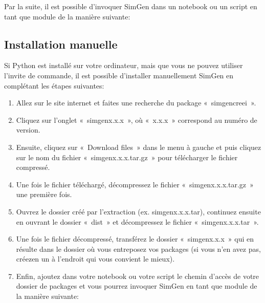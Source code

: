 \documentclass[letterpaper,10pt,french]{sphinxmanual}
\begin{document}
Par la suite, il est possible d’invoquer SimGen dans un notebook ou un script en tant que module de la manière suivante:

\begin{sphinxVerbatim}[commandchars=\\\{\}]
 
\end{sphinxVerbatim}


\subsection{Installation manuelle}
\label{\detokenize{installation:installation-manuelle}}
Si Python est installé sur votre ordinateur, mais que vous ne pouvez utiliser l’invite de commande,
il est possible d’installer manuellement SimGen en complétant les étapes suivantes:
\begin{enumerate}
%
\item {} 
Allez sur le site internet  et faites une recherche du package « simgen\sphinxhyphen{}creei ».

\item {} 
Cliquez sur l’onglet « simgen\sphinxhyphen{}x.x.x », où « x.x.x » correspond au numéro de version.

\item {} 
Ensuite, cliquez sur « Download files » dans le menu à gauche et puis cliquez sur le nom du fichier « simgen\sphinxhyphen{}x.x.x.tar.gz » pour télécharger le fichier compressé.

\item {} 
Une fois le fichier téléchargé, décompressez le fichier « simgen\sphinxhyphen{}x.x.x.tar.gz » une première fois.

\item {} 
Ouvrez le dossier créé par l’extraction (ex. simgen\sphinxhyphen{}x.x.x.tar), continuez ensuite en ouvrant le dossier « dist » et décompressez le fichier « simgen\sphinxhyphen{}x.x.x.tar ».

\item {} 
Une fois le fichier décompressé, transférez le dossier « simgen\sphinxhyphen{}x.x.x » qui en résulte dans le dossier où vous entreposez vos packages (si vous n’en avez pas, créez\sphinxhyphen{}en un à l’endroit qui vous convient le mieux).

\item {} 
Enfin, ajoutez dans votre notebook ou votre script le chemin d’accès de votre dossier de packages et vous pourrez invoquer SimGen en tant que module de la manière suivante:

\end{enumerate}
\end{document}
